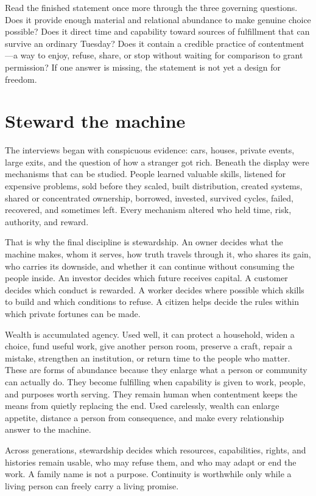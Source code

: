 Read the finished statement once more through the three governing questions.
Does it provide enough material and relational abundance to make genuine
choice possible? Does it direct time and capability toward sources of
fulfillment that can survive an ordinary Tuesday? Does it contain a credible
practice of contentment---a way to enjoy, refuse, share, or stop without waiting
for comparison to grant permission? If one answer is missing, the statement is
not yet a design for freedom.

\section{Steward the machine}

The interviews began with conspicuous evidence: cars, houses, private events,
large exits, and the question of how a stranger got rich. Beneath the display
were mechanisms that can be studied. People learned valuable skills, listened
for expensive problems, sold before they scaled, built distribution, created
systems, shared or concentrated ownership, borrowed, invested, survived
cycles, failed, recovered, and sometimes left. Every mechanism altered who
held time, risk, authority, and reward.

That is why the final discipline is stewardship. An owner decides what the
machine makes, whom it serves, how truth travels through it, who shares its
gain, who carries its downside, and whether it can continue without consuming
the people inside. An investor decides which future receives capital. A
customer decides which conduct is rewarded. A worker decides where possible
which skills to build and which conditions to refuse. A citizen helps decide
the rules within which private fortunes can be made.

Wealth is accumulated agency. Used well, it can protect a household, widen a
choice, fund useful work, give another person room, preserve a craft, repair a
mistake, strengthen an institution, or return time to the people who matter.
These are forms of abundance because they enlarge what a person or community
can actually do. They become fulfilling when capability is given to work,
people, and purposes worth serving. They remain human when contentment keeps
the means from quietly replacing the end. Used carelessly, wealth can enlarge
appetite, distance a person from consequence, and make every relationship
answer to the machine.

Across generations, stewardship decides which resources, capabilities, rights,
and histories remain usable, who may refuse them, and who may adapt or end the
work. A family name is not a purpose. Continuity is worthwhile only while a
living person can freely carry a living promise.

